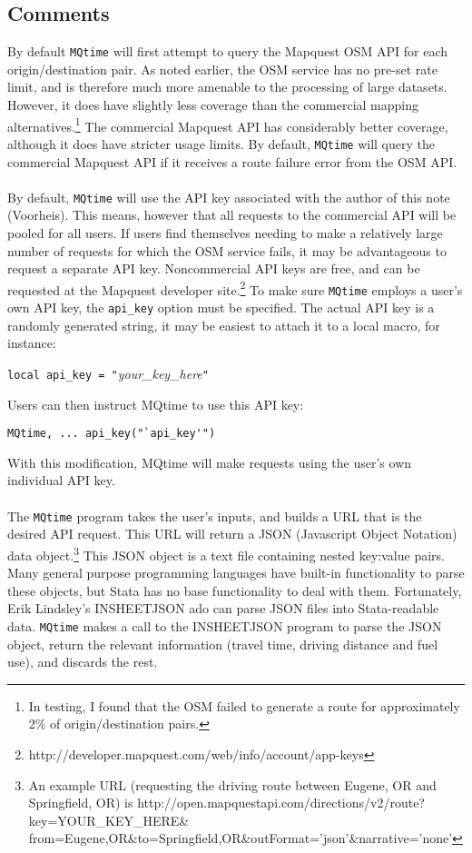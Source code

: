 \documentclass[12pt]{article}
\begin{document}
\subsection{Comments}
By default \verb|MQtime| will first attempt to query the Mapquest OSM API for each origin/destination pair. As noted earlier, the OSM service has no pre-set rate limit, and is therefore much more amenable to the processing of large datasets. However, it does have slightly less coverage than the commercial mapping alternatives.\footnote{In testing, I found that the OSM failed to generate a route for approximately 2\% of origin/destination pairs.} The commercial Mapquest API has considerably better coverage, although it does have stricter usage limits. By default, \verb|MQtime| will query the commercial Mapquest API if it receives a route failure error from the OSM API. 
\\ \\
By default, \verb|MQtime| will use the API key associated with the author of this note (Voorheis). This means, however  that all requests to the commercial API will be pooled for all users. If users find themselves needing to make a relatively large number of requests for which the OSM service fails, it may be advantageous to request a separate API key. Noncommercial API keys are free, and can be requested at the Mapquest developer site.\footnote{http://developer.mapquest.com/web/info/account/app-keys} To make sure \verb|MQtime| employs a user's own API key, the \verb|api_key| option must be specified. The actual API key is a randomly generated string, it may be easiest to attach it to a local macro, for instance:
\begin{center}
\verb|local api_key = "|\textit{your\_key\_here}\verb|"|
\end{center}
Users can then instruct MQtime to use this API key:
\begin{center}
\verb|MQtime, ... api_key("`api_key'")|
\end{center}
With this modification, MQtime will make requests using the user's own individual API key.
\\ \\
The \verb|MQtime| program takes the user's inputs, and builds a URL that is the desired API request. This URL will return a JSON (Javascript Object Notation) data object.\footnote{An example URL (requesting the driving route between Eugene, OR and Springfield, OR) is http://open.mapquestapi.com/directions/v2/route?key=YOUR\_KEY\_HERE\& from=Eugene,OR\&to=Springfield,OR\&outFormat='json'\&narrative='none'} This JSON object is a text file containing nested key:value pairs. Many general purpose programming languages have built-in functionality to parse these objects, but Stata has no base functionality to deal with them. Fortunately, Erik Lindsley's INSHEETJSON ado can parse JSON files into Stata-readable data. \verb|MQtime| makes a call to the INSHEETJSON program to parse the JSON object, return the relevant information (travel time, driving distance and fuel use), and discards the rest.
\end{document}
